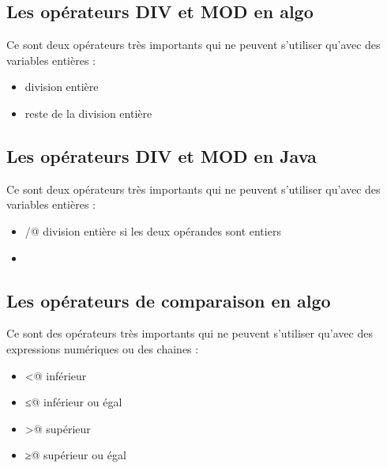 \documentclass[11pt,a4paper]{article}
\begin{document}
            \par
        \subsection{Les op\'erateurs DIV et MOD en algo}
          Ce sont deux op\'erateurs tr\`es importants qui ne peuvent s'utiliser qu'avec des variables enti\`eres :
          
					\begin{itemize}
				
			\item \verb@DIV@ division enti\`ere
			\item \verb@MOD@ reste de la division enti\`ere
					\end{itemize}
				
            \par
        \subsection{Les op\'erateurs DIV et MOD en Java}
          Ce sont deux op\'erateurs tr\`es importants qui ne peuvent s'utiliser qu'avec des variables enti\`eres :
          
					\begin{itemize}
				
			\item \verb@/@ division enti\`ere si les deux op\'erandes sont entiers
			\item \verb@%@ reste de la division enti\`ere
					\end{itemize}
				
            \par
        \subsection{Les op\'erateurs de comparaison en algo}
          Ce sont des op\'erateurs tr\`es importants qui ne peuvent s'utiliser qu'avec des expressions num\'eriques ou des chaines :
          
					\begin{itemize}
				
			\item \verb@<@ inf\'erieur 
			\item \verb@≤@ inf\'erieur ou \'egal 
			\item \verb@>@ sup\'erieur 
			\item \verb@≥@ sup\'erieur ou \'egal 
					\end{itemize}
				
\end{document}
